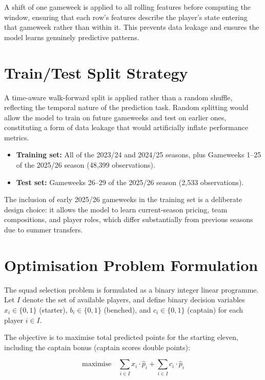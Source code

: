 \documentclass[11pt,english,listoffigures,listoftables]{tfgetsinf}
\begin{document}
A shift of one gameweek is applied to all rolling features before computing the window, ensuring that each row's features describe the player's state entering that gameweek rather than within it. This prevents data leakage and ensures the model learns genuinely predictive patterns.

\section{Train/Test Split Strategy}

A time-aware walk-forward split is applied rather than a random shuffle, reflecting the temporal nature of the prediction task. Random splitting would allow the model to train on future gameweeks and test on earlier ones, constituting a form of data leakage that would artificially inflate performance metrics.

\begin{itemize}
    \item \textbf{Training set:} All of the 2023/24 and 2024/25 seasons, plus Gameweeks 1--25 of the 2025/26 season (48,399 observations).
    \item \textbf{Test set:} Gameweeks 26--29 of the 2025/26 season (2,533 observations).
\end{itemize}

The inclusion of early 2025/26 gameweeks in the training set is a deliberate design choice: it allows the model to learn current-season pricing, team compositions, and player roles, which differ substantially from previous seasons due to summer transfers.

\section{Optimisation Problem Formulation}

The squad selection problem is formulated as a binary integer linear programme. Let $I$ denote the set of available players, and define binary decision variables $x_i \in \{0,1\}$ (starter), $b_i \in \{0,1\}$ (benched), and $c_i \in \{0,1\}$ (captain) for each player $i \in I$.

The objective is to maximise total predicted points for the starting eleven, including the captain bonus (captain scores double points):

\begin{equation}
\text{maximise} \quad \sum_{i \in I} x_i \cdot \hat{p}_i + \sum_{i \in I} c_i \cdot \hat{p}_i
\end{equation}
\end{document}
